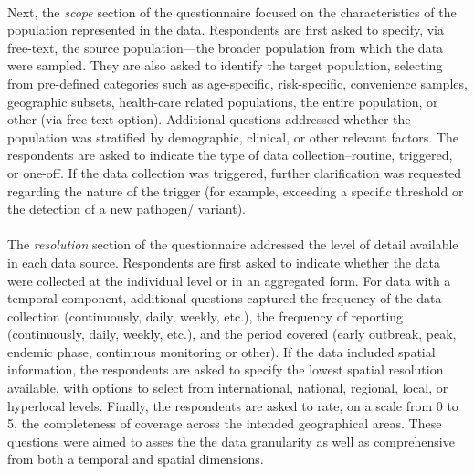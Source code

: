 \documentclass{article}
\begin{document}
\paragraph{}Next, the \textit{scope} section of the questionnaire focused on the characteristics of the population represented in the data. Respondents are first asked to specify, via free-text, the source population---the broader population from which the data were sampled. They are also asked to identify the target population, selecting from pre-defined categories such as age-specific, risk-specific, convenience samples, geographic subsets, health-care related populations, the entire population, or other (via free-text option). Additional questions addressed whether the population was stratified by demographic, clinical, or other relevant factors. The respondents are asked to indicate the type of data collection--routine, triggered, or one-off. If the data collection was triggered, further clarification was requested regarding the nature of the trigger (for example, exceeding a specific threshold or the detection of a new pathogen/ variant). 

\paragraph{}The \textit{resolution} section of the questionnaire addressed the level of detail available in each data source. Respondents are first asked to indicate whether the data were collected at the individual level or in an aggregated form. For data with a temporal component, additional questions captured the frequency of the data collection (continuously, daily, weekly, etc.), the frequency of reporting (continuously, daily, weekly, etc.), and the period covered (early outbreak, peak, endemic phase, continuous monitoring or other). If the data included spatial information, the respondents are asked to specify the lowest spatial resolution available, with options to select from international, national, regional, local, or hyperlocal levels. Finally, the respondents are asked to rate, on a scale from 0 to 5, the completeness of coverage across the intended geographical areas. These questions were aimed to asses the the data granularity as well as comprehensive from both a temporal and spatial dimensions. 
\end{document}
